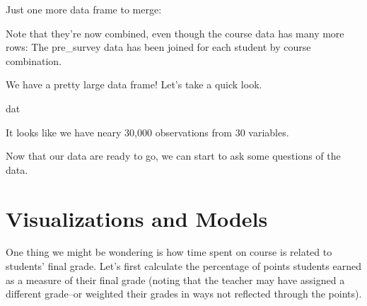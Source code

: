 \documentclass[]{book}
\newenvironment{Shaded}{\begin{snugshade}}{\end{snugshade}}
\newcommand{\KeywordTok}[1]{\textcolor[rgb]{0.13,0.29,0.53}{\textbf{#1}}}
\newcommand{\DataTypeTok}[1]{\textcolor[rgb]{0.13,0.29,0.53}{#1}}
\newcommand{\StringTok}[1]{\textcolor[rgb]{0.31,0.60,0.02}{#1}}
\newcommand{\OperatorTok}[1]{\textcolor[rgb]{0.81,0.36,0.00}{\textbf{#1}}}
\newcommand{\NormalTok}[1]{#1}
\begin{document}
Just one more data frame to merge:

\begin{Shaded}
\end{Shaded}

Note that they're now combined, even though the course data has many
more rows: The pre\_survey data has been joined for each student by
course combination.

We have a pretty large data frame! Let's take a quick look.

\begin{Shaded}
\begin{Highlighting}[]
\NormalTok{dat}
\end{Highlighting}
\end{Shaded}

It looks like we have neary 30,000 observations from 30 variables.

Now that our data are ready to go, we can start to ask some questions of
the data.

\chapter{Visualizations and Models}\label{visualizations-and-models}

One thing we might be wondering is how time spent on course is related
to students' final grade. Let's first calculate the percentage of points
students earned as a measure of their final grade (noting that the
teacher may have assigned a different grade--or weighted their grades in
ways not reflected through the points).
\end{document}
